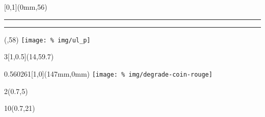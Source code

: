 \begin{frame}[plain]
  \begin{textblock*}{\paperwidth}[0,1](0mm,56\TPVertModule)
    \textcolor{rouge}{\rule{\banderougewidth}{\banderougeheight}}%
    \textcolor{or}{\rule{\bandeorwidth}{\bandeorheight}}           %
  \end{textblock*}

  \begin{textblock*}{\bandeorwidth}(\banderougewidth,58\TPVertModule)
    \texttt{[image: \%
      img/ul\_p]}
  \end{textblock*}
  \begin{textblock*}{3\TPHorizModule}[1,0.5](14\TPHorizModule,59.7\TPVertModule)
    \raggedleft\cfddfmt
  \end{textblock*}

  \begin{textblock*}{0.560261\imageheight}[1,0](147mm,0mm)
    \texttt{[image: \%
	img/degrade-coin-rouge]}
  \end{textblock*}

  \begin{textblock*}{2\TPHorizModule}(0.7\TPHorizModule,5\TPVertModule)
    \textcolor[rgb]{0.37,0.37,0.37}{\webinaire}
  \end{textblock*}

  \begin{textblock*}{10\TPHorizModule}(0.7\TPHorizModule,21\TPVertModule)
    \textcolor[cmyk]{0.67, 0.66, 0, 0.71}{\titlefmt}
  \end{textblock*}\end{frame}
\endgroup

